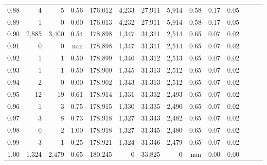 \begin{tabular}{rrrrrrrrrrrrrr}
0.88 &       4 &      5 &  0.56 &  176,012 &    4,233 &  27,911 &   5,914 &  0.58 &  0.17 &      0.05 \\
0.89 &       1 &      0 &  0.00 &  176,013 &    4,232 &  27,911 &   5,914 &  0.58 &  0.17 &      0.05 \\
0.90 &   2,885 &  3,400 &  0.54 &  178,898 &    1,347 &  31,311 &   2,514 &  0.65 &  0.07 &      0.02 \\
0.91 &       0 &      0 &   nan &  178,898 &    1,347 &  31,311 &   2,514 &  0.65 &  0.07 &      0.02 \\
0.92 &       1 &      1 &  0.50 &  178,899 &    1,346 &  31,312 &   2,513 &  0.65 &  0.07 &      0.02 \\
0.93 &       1 &      1 &  0.50 &  178,900 &    1,345 &  31,313 &   2,512 &  0.65 &  0.07 &      0.02 \\
0.94 &       2 &      0 &  0.00 &  178,902 &    1,343 &  31,313 &   2,512 &  0.65 &  0.07 &      0.02 \\
0.95 &      12 &     19 &  0.61 &  178,914 &    1,331 &  31,332 &   2,493 &  0.65 &  0.07 &      0.02 \\
0.96 &       1 &      3 &  0.75 &  178,915 &    1,330 &  31,335 &   2,490 &  0.65 &  0.07 &      0.02 \\
0.97 &       3 &      8 &  0.73 &  178,918 &    1,327 &  31,343 &   2,482 &  0.65 &  0.07 &      0.02 \\
0.98 &       0 &      2 &  1.00 &  178,918 &    1,327 &  31,345 &   2,480 &  0.65 &  0.07 &      0.02 \\
0.99 &       3 &      1 &  0.25 &  178,921 &    1,324 &  31,346 &   2,479 &  0.65 &  0.07 &      0.02 \\
1.00 &   1,324 &  2,479 &  0.65 &  180,245 &        0 &  33,825 &       0 &   nan &  0.00 &      0.00 \\
\bottomrule
\end{tabular}
